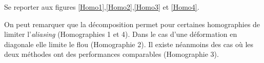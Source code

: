 

Se reporter aux figures \ref{Homo1},\ref{Homo2},\ref{Homo3} et \ref{Homo4}.

On peut remarquer que la décomposition permet pour certaines homographies de limiter l'\emph{aliasing} (Homographies 1 et 4). Dans le cas d'une déformation en diagonale elle limite le flou (Homographie 2). Il existe néanmoins des cas où les deux méthodes ont des performances comparables (Homographie 3).

\begin{figure}

\end{figure}
